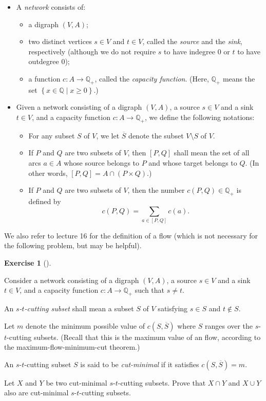 \documentclass[numbers=enddot,12pt,final,onecolumn,notitlepage]{scrartcl}%
\newcounter{exer}
\theoremstyle{definition}
\newtheorem{exmp}[exer]{Exercise}
\newenvironment{exercise}[1][]
{\begin{exmp}[#1]\begin{leftbar}}
{\end{leftbar}\end{exmp}}
\let\sumnonlimits\sum
\renewcommand{\sum}{\sumnonlimits\limits}
\newcommand{\QQ}{\mathbb{Q}}
\newcommand{\set}[1]{\left\{ #1 \right\}}
\newcommand{\tup}[1]{\left( #1 \right)}
\newcommand{\ive}[1]{\left[ #1 \right]}
\begin{document}
\begin{itemize}
\item A \textit{network} consists of:
      \begin{itemize}
      \item a digraph $\tup{V, A}$;
      \item two distinct vertices $s \in V$ and $t \in V$,
            called the \textit{source} and the \textit{sink},
            respectively (although we do not require $s$ to
            have indegree $0$ or $t$ to have outdegree $0$);
      \item a function $c : A \to \QQ_+$, called the
            \textit{capacity function}.
            (Here, $\QQ_+$ means the set
            $\set{ x \in \QQ \mid x \geq 0 }$.)
      \end{itemize}

\item Given a network consisting of a digraph
      $\tup{V, A}$, a source $s \in V$ and a sink $t \in V$,
      and a capacity function $c : A \to \QQ_+$, we define
      the following notations:
      \begin{itemize}
      \item For any subset $S$ of $V$, we let $\overline{S}$
            denote the subset $V \setminus S$ of $V$.
      \item If $P$ and $Q$ are two subsets of $V$, then
            $\ive{P, Q}$ shall mean the set of all arcs
            $a \in A$ whose source belongs to $P$ and whose
            target belongs to $Q$.
            (In other words,
            $\ive{P, Q} = A \cap \tup{P \times Q}$.)
      \item If $P$ and $Q$ are two subsets of $V$, then the
            number $c \tup{P, Q} \in \QQ_+$ is defined by
            \[
            c \tup{P, Q} = \sum_{a \in \ive{P, Q}} c \tup{a} .
            \]
      \end{itemize}
\end{itemize}

We also refer to lecture 16 \cite{lec16} for the definition of a flow
(which is not necessary for the following problem, but may
be helpful).

\begin{exercise} \label{exe.flows-cuts.cut-lattice}
Consider a network consisting of a digraph
$\tup{V, A}$, a source $s \in V$ and a sink $t \in V$,
and a capacity function $c : A \to \QQ_+$
such that $s \neq t$.

An \textit{$s$-$t$-cutting subset} shall mean a subset
$S$ of $V$ satisfying $s \in S$ and $t \notin S$.

Let $m$ denote the minimum possible value of
$c \tup{S, \overline{S}}$ where $S$ ranges over the
$s$-$t$-cutting subsets.
(Recall that this is the maximum value of an
flow, according to the
maximum-flow-minimum-cut theorem.)

An $s$-$t$-cutting subset $S$ is said to be
\textit{cut-minimal} if it satisfies
$c \tup{S, \overline{S}} = m$.

Let $X$ and $Y$ be two cut-minimal $s$-$t$-cutting subsets.
Prove that $X \cap Y$ and $X \cup Y$ also are
cut-minimal $s$-$t$-cutting subsets.
\end{exercise}
\end{document}
